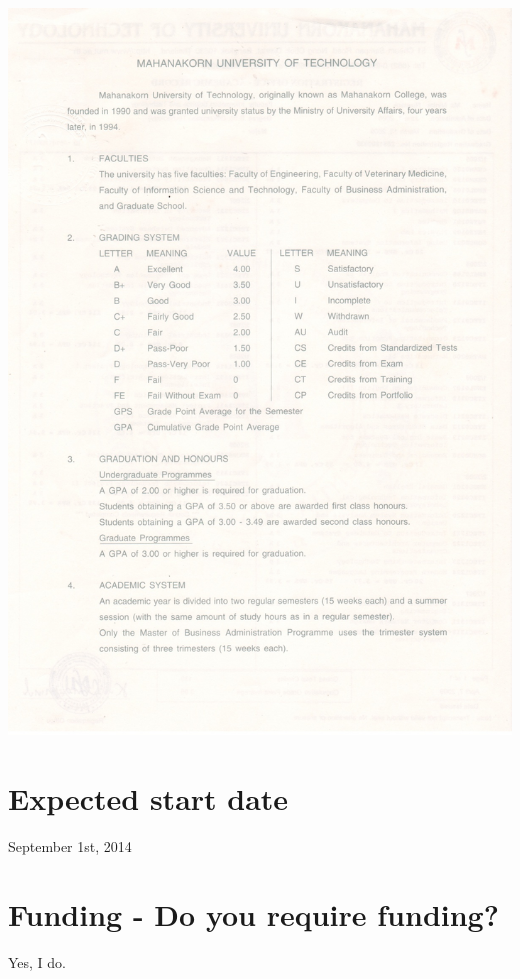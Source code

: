 \documentclass[11pt,a4paper,roman]{moderncv}        %
\begin{document}
\includegraphics[width=\textwidth]{images/bachelor_2}

\section{Expected start date}
September 1st, 2014
\section{Funding - Do you require funding?}
Yes, I do.

\nocite{*}

\end{document}
